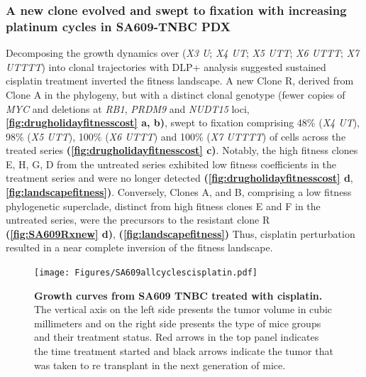 \subsubsection{A new clone evolved and swept to fixation with increasing platinum cycles in SA609-TNBC PDX}
Decomposing the growth dynamics over (\textit{X3 U}; \textit{X4 UT}; \textit{X5 UTT}; \textit{X6 UTTT}; \textit{X7 UTTTT}) into clonal trajectories with DLP+ analysis suggested sustained cisplatin treatment inverted the fitness landscape. A new Clone R,  derived from Clone A in the phylogeny, but with a distinct clonal genotype (fewer copies of \textit{MYC} and deletions at \textit{RB1}, \textit{PRDM9} and \textit{NUDT15} loci, \textbf{\autoref{fig:drugholidayfitnesscost} a, b)}, swept to fixation comprising 48\% (\textit{X4 UT}), 98\% (\textit{X5 UTT}), 100\% (\textit{X6 UTTT}) and 100\% (\textit{X7 UTTTT}) of cells across the treated series \textbf{(\autoref{fig:drugholidayfitnesscost} c)}. Notably, the high fitness clones E, H, G, D from the untreated series exhibited low fitness coefficients in the treatment series and were no longer detected \textbf{(\autoref{fig:drugholidayfitnesscost} d}, \textbf{\autoref{fig:landscapefitness})}. Conversely, Clones A, and B, comprising a low fitness phylogenetic superclade, distinct from high fitness clones E and F in the untreated series, were the precursors to the resistant clone R \textbf{(\autoref{fig:SA609Rxnew} d)},    \textbf{(\autoref{fig:landscapefitness})} Thus, cisplatin perturbation resulted in a near complete inversion of the fitness landscape.



\begin{figure}
\centering
\texttt{[image: Figures/SA609allcyclescisplatin.pdf]}
	
\caption[Representative growth curves from SA609 TNBC treated with cisplatin]
	{\small
	\textbf{Growth curves from SA609 TNBC treated with cisplatin.}
	   The vertical axis on the left side presents the tumor volume in cubic millimeters and on the right side presents the type of mice groups and their treatment status. Red arrows in the top panel indicates the time treatment started and black arrows indicate the tumor that was taken to re transplant in the next generation of mice.
	}
	\label{fig:SA609allcyclescisplatin}
\end{figure}




